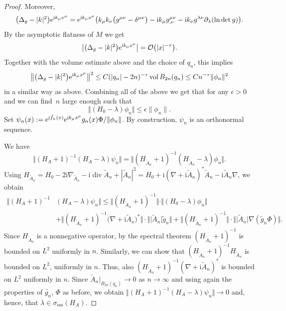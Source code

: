 \documentclass[pdftex]{sigma}
\numberwithin{equation}{section}
\begin{document}
\begin{proof}
Moreover, \[ \bigl(\Delta_g - |k|^2\bigr) {\rm e}^{{\mathrm{i}}k_\mu x^\mu} = {\rm e}^{{\mathrm{i}}k_\mu x^\mu} \bigl(k_\mu k_\nu \bigl(g^{\mu\nu} -\delta^{\mu\nu}\bigr) -{\mathrm{i}}k_\mu g^{\mu\nu}_{,\nu} - {\mathrm{i}}k_\nu g^{\lambda \nu}\partial_\lambda (\ln \det   g)\bigr).\]
By the asymptotic flatness of $M$ we get
\[ \bigl|\bigl(\Delta_g - |k|^2\bigr) {\rm e}^{{\mathrm{i}}k_\mu x^\mu}\bigr|=\mathcal{O}\bigl(|x|^{-{\tau}}\bigr).\]
Together with the volume estimate above and the choice of $q_n$, this implies
\[\bigl\Vert \bigl(\Delta_g - |k|^2\bigr) {\rm e}^{{\mathrm{i}}k_\mu x^\mu}\bigr\Vert^2 \leq C (|q_n|-2n)^{-\tau} \operatorname{vol}  B_{2n}(q_n) \leq C n^{-\tau} \| \phi_n\|^2
\]
in a similar way as above.
Combining all of the above we get that for any $\epsilon>0$ and we can find~$n$ large enough such that{\samepage
\[
\Vert (H_0 -\lambda)\phi_n\Vert \leq \epsilon \| \phi_n\|.
\]
Set $\psi_n(x) := {\rm e}^{{\mathrm{i}}\tilde{f}_n(x)} {\rm e}^{{\mathrm{i}}k_\mu x^\mu} {g}_n(x)\Phi / \|\phi_n\|$. By construction, $\psi_n$ is an orthonormal sequence.}
	
We have
\[\bigl\Vert (H_A+1)^{-1}(H_A-\lambda)\psi_n\bigr\Vert = \bigl\Vert (H_{\tilde{A}_n}+1)^{-1}(H_{\tilde{A}_n}-\lambda)\phi_n\bigr\Vert.\]
Using $ H_{\tilde{A}_n} = H_0 -2{\mathrm{i}}  \nabla_{\tilde{A}_n} -{\mathrm{i}}  \operatorname{div} \tilde{A}_n +|\tilde{A}_n|^2 =H_0 +{\mathrm{i}}  (\nabla +{\mathrm{i}}\tilde{A}_n)^* \tilde{A}_n - {\mathrm{i}}\tilde{A}_n\nabla$,
we obtain	
\begin{align*}
\bigl\Vert (H_A+1)^{-1}&(H_A-\lambda)\psi_n\bigr\Vert
\leq\bigl\Vert (H_{\tilde{A}_n}+1)^{-1}\bigr\Vert \cdot \Vert (H_0 -\lambda)\phi_n\Vert\\
& +\bigl\Vert (H_{\tilde{A}_n}+1)^{-1} \bigl(\nabla +{\mathrm{i}}\tilde{A}_n\bigr)^*\bigr\Vert\cdot \bigl\Vert \bigl|\tilde{A}_n\bigr| \tilde{g}_n\bigl\Vert
+\bigl\Vert (H_{\tilde{A}_n}+1)^{-1} \bigr\Vert \cdot \bigl\Vert \bigl|\tilde{A}_n\bigr| \nabla (\tilde{g}_n \Phi)\bigr\Vert.
\end{align*}
Since $H_{\tilde{A}_n}$ is a nonnegative operator, by the spectral theorem $(H_{\tilde{A}_n}+1)^{-1}$ is bounded on $L^2$ uniformly in $n$. Similarly, we can show that $(H_{\tilde{A}_n}+1)^{-1} H_{\tilde{A}_n}$ is bounded on $L^2$, uniformly in $n$. Thus, also $(H_{\tilde{A}_n}+1)^{-1} (\nabla +{\mathrm{i}}\tilde{A}_n)^* $ is bounded on $L^2$ uniformly in $n$. Since $\tilde{A}_n|_{B_{2n}(q_n)}\to 0$ as $n\to \infty$ and using again the properties of $\tilde{g_n}$, $\Phi$ as before, we obtain $\bigl\Vert (H_A+1)^{-1}(H_A-\lambda)\psi_n\bigr\Vert \to 0$ and, hence, that $\lambda\in \sigma_{\mathrm{ess}} (H_A)$.
	

\end{proof}
\end{document}
